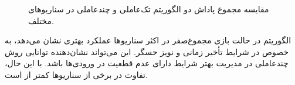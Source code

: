 \begin{figure}[H]
	
	\caption{مقایسه مجموع پاداش دو الگوریتم تک‌عاملی و چندعاملی  در سناریوهای مختلف. 
		}
	\label{fig:ppo_robustness_violin}
\end{figure}

الگوریتم  در حالت بازی مجموع‌صفر در اکثر سناریوها عملکرد بهتری نشان می‌دهد، به خصوص در شرایط تأخیر زمانی و نویز حسگر. این می‌تواند نشان‌دهنده توانایی روش چندعاملی در مدیریت بهتر شرایط دارای عدم قطعیت در ورودی‌ها باشد. با این حال، تفاوت در برخی از سناریوها کمتر از  است.




